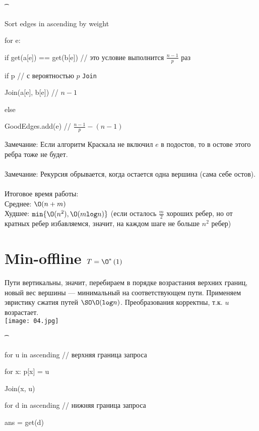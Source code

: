 	\t{\begin{MyList}
         \item \hspace{0em} Sort edges in ascending by weight
          \item \hspace{0em} for e:
          \item \hspace{2em} if get(a[e]) == get(b[e]) // это условие выполнится $\frac{n - 1}{p}$ раз
          \item \hspace{4em} if p // с вероятностью $p$ \texttt{Join}
          \item \hspace{6em} Join(a[e], b[e]) // $n - 1$
          \item \hspace{4em} else
          \item \hspace{6em} GoodEdges.add(e) // $\frac{n - 1}{p} - (n - 1)$
        \end{MyList}}
	Замечание: Если алгоритм Краскала не включил $e$ в подостов, то в остове этого ребра тоже не будет. \\
\\
	Замечание: Рекурсия обрывается, когда остается одна вершина (сама себе остов). \\
\\
	Итоговое время работы: \\
	Среднее: $\O(n + m)$ \\
	Худшее: $\texttt{min}\{\O(n^2), \O(m\texttt{log}n)\}$ (если осталось $\frac{m}{2}$ хороших ребер, но от кратных ребер избавляемся, значит, на каждом шаге не больше $n^2$ ребер)\\

\section{Min-offline $T =  \O^*\left(1\right)$}
	Пути вертикальны, значит, перебираем в порядке возрастания верхних границ, новый вес вершины — минимальный на соответствующем пути. Применяем эвристику сжатия путей $\SO \O(\texttt{log}n)$. Преобразования корректны, т.к. $u$ возрастает. \\

\texttt{[image: 04.jpg]}

	\t{\begin{MyList}
         \item \hspace{0em} for u in ascending // верхняя граница запроса
          \item \hspace{2em} for x: p[x] = u
          \item \hspace{4em} Join(x, u)
          \item \hspace{2em} for d in ascending // нижняя граница запроса
          \item \hspace{4em} ans = get(d)
        \end{MyList}}

